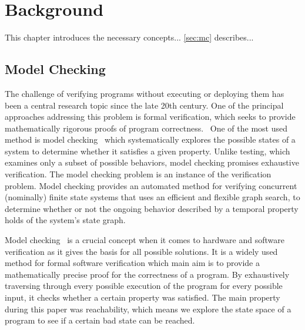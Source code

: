 \chapter{Background}

This chapter introduces the necessary concepts... %
\autoref{sec:mc} describes... %


\section{Model Checking}\label{sec:mc}


The challenge of verifying programs without executing or deploying them has been a central research topic since the late 20th century. One of the principal approaches addressing this problem is formal verification, which seeks to provide mathematically rigorous proofs of program correctness.~\cite{MC} %
One of the most used method is model checking~\cite{modelChecking}\cite{modelChecking2} which systematically explores the possible states of a system to determine whether it satisfies a given property. Unlike testing, which examines only a subset of possible behaviors, model checking promises exhaustive verification. %
The model checking problem is an instance of the verification problem. Model checking provides an automated method for verifying concurrent (nominally) finite state systems that uses an efficient and flexible graph search, to determine whether or not the ongoing behavior described by a temporal property holds of the system's state graph.




Model checking~\cite{modelChecking} is a crucial concept when it comes to hardware and software verification as it gives the basis for all possible solutions. %
It is a widely used method for formal software verification  which main aim is to provide a mathematically precise proof for the correctness of a program. %
By exhaustively traversing through every possible execution of the program for every possible input, it checks whether a certain property was satisfied. %
The main property during this paper was reachability, which means we explore the state space of a program to see if a certain bad state can be reached.

